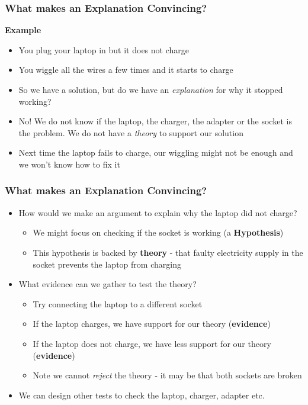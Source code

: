 \documentclass[xcolor=x11names,compress]{beamer}\usepackage[]{graphicx}\usepackage[]{xcolor}
\renewcommand{\(}{\begin{columns}}
\renewcommand{\)}{\end{columns}}
\newcommand{\<}[1]{\begin{column}{#1}}
\renewcommand{\>}{\end{column}}
\begin{document}
\begin{frame}
\frametitle{What makes an Explanation Convincing?}
\textbf{Example}
\begin{itemize}
\item  You plug your laptop in but it does not charge
\pause
\item You wiggle all the wires a few times and it starts to charge
\pause
\item So we have a solution, but do we have an \textit{explanation} for why it stopped working?
\pause
\item No! We do not know if the laptop, the charger, the adapter or the socket is the problem. We do not have a \textit{theory} to support our solution
\pause
\item Next time the laptop fails to charge, our wiggling might not be enough and we won't know how to fix it
\end{itemize}
\end{frame}

\begin{frame}
\frametitle{What makes an Explanation Convincing?}
\begin{itemize}
\item How would we make an argument to explain why the laptop did not charge?
\pause
\begin{itemize}
\item We might focus on checking if the socket is working (a \textbf{Hypothesis})
\pause
\item This hypothesis is backed by \textbf{theory} - that faulty electricity supply in the socket prevents the laptop from charging
\pause
\end{itemize}
\item What evidence can we gather to test the theory?
\pause
\begin{itemize}
\item Try connecting the laptop to a different socket
\pause
\item If the laptop charges, we have support for our theory (\textbf{evidence})
\pause
\item If the laptop does not charge, we have less support for our theory (\textbf{evidence})
\pause
\item Note we cannot \textit{reject} the theory - it may be that both sockets are broken
\pause
\end{itemize}
\item We can design other tests to check the laptop, charger, adapter etc. 
\end{itemize}
\end{frame}
\end{document}
